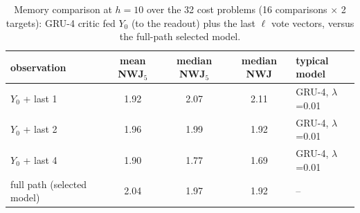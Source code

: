 \begin{table}[htbp]
\centering
\small
\caption{Memory comparison at $h=10$ over the 32 cost problems (16 comparisons $\times$ 2 targets): GRU-4 critic fed $Y_0$ (to the readout) plus the last $\ell$ vote vectors, versus the full-path selected model.}\label{tab:memory}
\begin{tabular}{l ccc l}
\toprule
observation & mean NWJ$_5$ & median NWJ$_5$ & median NWJ & typical model \\
\midrule
$Y_0$ + last 1 & 1.92 & 2.07 & 2.11 & GRU-4, $\lambda$=0.01 \\
$Y_0$ + last 2 & 1.96 & 1.99 & 1.92 & GRU-4, $\lambda$=0.01 \\
$Y_0$ + last 4 & 1.90 & 1.77 & 1.69 & GRU-4, $\lambda$=0.01 \\
full path (selected model) & 2.04 & 1.97 & 1.92 & -- \\
\bottomrule
\end{tabular}
\end{table}